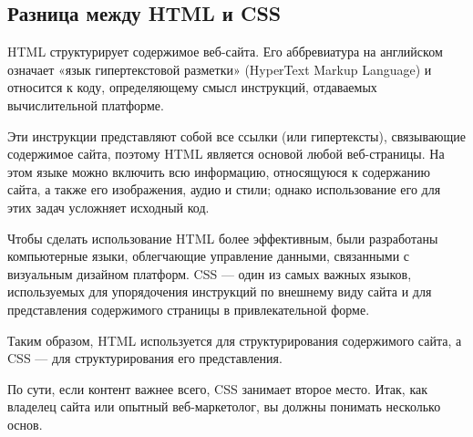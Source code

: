 \subsection{Разница между HTML и CSS}

HTML структурирует содержимое веб-сайта. Его аббревиатура на английском означает «язык гипертекстовой разметки» (HyperText Markup Language) и относится к коду, определяющему смысл инструкций, отдаваемых вычислительной платформе.

Эти инструкции представляют собой все ссылки (или гипертексты), связывающие содержимое сайта, поэтому HTML является основой любой веб-страницы. На этом языке можно включить всю информацию, относящуюся к содержанию сайта, а также его изображения, аудио и стили; однако использование его для этих задач усложняет исходный код.

Чтобы сделать использование HTML более эффективным, были разработаны компьютерные языки, облегчающие управление данными, связанными с визуальным дизайном платформ. CSS — один из самых важных языков, используемых для упорядочения инструкций по внешнему виду сайта и для представления содержимого страницы в привлекательной форме.

Таким образом, HTML используется для структурирования содержимого сайта, а CSS — для структурирования его представления.

По сути, если контент важнее всего, CSS занимает второе место. Итак, как владелец сайта или опытный веб-маркетолог, вы должны понимать несколько основ.

